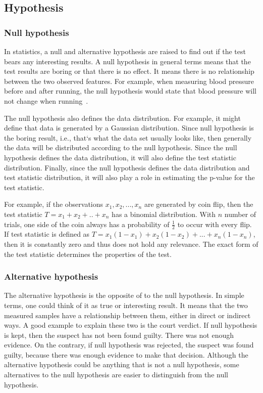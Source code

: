\documentclass[12pt]{article}
\begin{document}
{\subsection{Hypothesis}

\subsubsection{Null hypothesis}

In statistics, a null and alternative hypothesis are raised to find out if the test bears any interesting results. A null hypothesis in general terms means that the test results are boring or that there is no effect. It means there is no relationship between the two observed features. For example, when measuring blood pressure before and after running, the null hypothesis would state that blood pressure will not change when running~\cite{triola_elementary_statistics}.

The null hypothesis also defines the data distribution. For example, it might define that data is generated by a Gaussian distribution. Since null hypothesis is the boring result, i.e., that`s what the data set usually looks like, then generally the data will be distributed according to the null hypothesis. Since the null hypothesis defines the data distribution, it will also define the test statistic distribution. Finally, since the null hypothesis defines the data distribution and test statistic distribution, it will also play a role in estimating the p-value for the test statistic.

For example, if the observations $x_1, x_2, ..., x_n$ are generated by coin flip, then the test statistic $T=x_1 + x_2 + .. + x_n$ has a binomial distribution. With $n$ number of trials, one side of the coin always has a probability of $\frac{1}{2}$ to occur with every flip. If test statistic is defined as $T=x_1(1-x_1) + x_2(1-x_2) + ... + x_n(1-x_n)$, then it is constantly zero and thus does not hold any relevance. The exact form of the test statistic determines the properties of the test.

\subsubsection{Alternative hypothesis}
The alternative hypothesis is the opposite of to the null hypothesis. In simple terms, one could think of it as true or interesting result. It means that the two measured samples have a relationship between them, either in direct or indirect ways. A good example to explain these two is the court verdict. If null hypothesis is kept, then the suspect has not been found guilty. There was not enough evidence. On the contrary, if null hypothesis was rejected, the suspect was found guilty, because there was enough evidence to make that decision. Although the alternative hypothesis could be anything that is not a null hypothesis, some alternatives to the null hypothesis are easier to distinguish from the null hypothesis.

}
\end{document}
